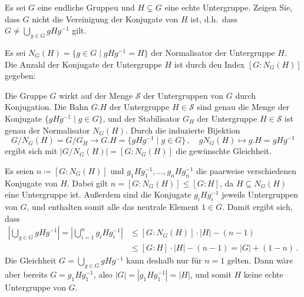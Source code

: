 \begin{question}[subtitle = Vereinigung von Konjugaten]
  Es sei $G$ eine endliche Gruppeu und $H \subsetneq G$ eine echte Untergruppe.
  Zeigen Sie, dass $G$ nicht die Vereinigung der Konjugate von $H$ ist, d.h.\ dass $G \neq \bigcup_{g \in G} gHg^{-1}$ gilt.
\end{question}


\begin{solution}
  Es sei $N_G(H) = \{g \in G \mid gHg^{-1} = H\}$ der Normalisator der Untergruppe $H$.
  Die Anzahl der Konjugate der Untergruppe $H$ ist durch den Index $[G : N_G(H)]$ gegeben:
  
  Die Gruppe $G$ wirkt auf der Menge $\mathcal{S}$ der Untergruppen von $G$ durch Konjugation.
  Die Bahn $G.H$ der Untergruppe $H \in \mathcal{S}$ sind genau die Menge der Konjugate $\{gHg^{-1} \mid g \in G\}$, und der Stabilisator $G_H$ der Untergruppe $H \in \mathcal{S}$ ist genau der Normalisator $N_G(H)$.
  Durch die induzierte Bijektion
  \[
            G/N_G(H)
    =       G/G_H 
    \to     G.H
    =       \{gHg^{-1} \mid g \in G\} \,,
    \quad   g N_G(H)
    \mapsto g.H = gHg^{-1}
  \]
  ergibt sich mit $|G/N_G(H)| = [G : N_G(H)]$ die gewünschte Gleichheit.
  
  Es seien $n \coloneqq [G : N_G(H)]$ und $g_1 H g_1^{-1}, \dotsc, g_n H g_n^{-1}$ die paarweise verschiedenen Konjugate von $H$.
  Dabei gilt $n = [G : N_G(H)] \leq [G : H]$, da $H \subseteq N_G(H)$ eine Untergruppe ist.
  Außerdem sind die Konjugate $g_i H g_i^{-1}$ jeweils Untergruppen von $G$, und enthalten somit alle das neutrale Element $1 \in G$.
  Damit ergibt sich, dass
  \begin{align*}
          \left|
            \bigcup_{g \in G} gHg^{-1}
          \right|
     =    \left|
            \bigcup_{i=1}^n g_i H g_i^{-1}
          \right|
    &\leq [G : N_G(H)] \cdot |H| - (n-1)  \\
    &\leq [G : H] \cdot |H| - (n-1)
     =    |G| + (1-n) \,.
  \end{align*}
  Die Gleichheit $G = \bigcup_{g \in G} gHg^{-1}$ kann deshalb nur für $n = 1$ gelten.
  Dann wäre aber bereits $G = g_1 H g_1^{-1}$, also $|G| = |g_1 H g_1^{-1}| = |H|$, und somit $H$ keine echte Untergruppe von $G$.
\end{solution}


